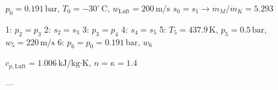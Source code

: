 \( p_0 = 0.191 \, \text{bar} \), \( T_0 = -30^\circ \, \text{C} \), \( w_{\text{Luft}} = 200 \, \text{m/s} \)  
\( s_0 = s_1 \rightarrow \dot{m}_M / \dot{m}_K = 5.293 \)  

1: \( p_2 = p_3 \)  
2: \( s_2 = s_3 \)  
3: \( p_3 = p_4 \)  
4: \( s_4 = s_5 \)  
5: \( T_5 = 437.9 \, \text{K} \), \( p_5 = 0.5 \, \text{bar} \), \( w_5 = 220 \, \text{m/s} \)  
6: \( p_6 = p_0 = 0.191 \, \text{bar} \), \( w_6 \)  

\( c_{p,\text{Luft}} = 1.006 \, \text{kJ/kg·K} \), \( n = \kappa = 1.4 \)  

---